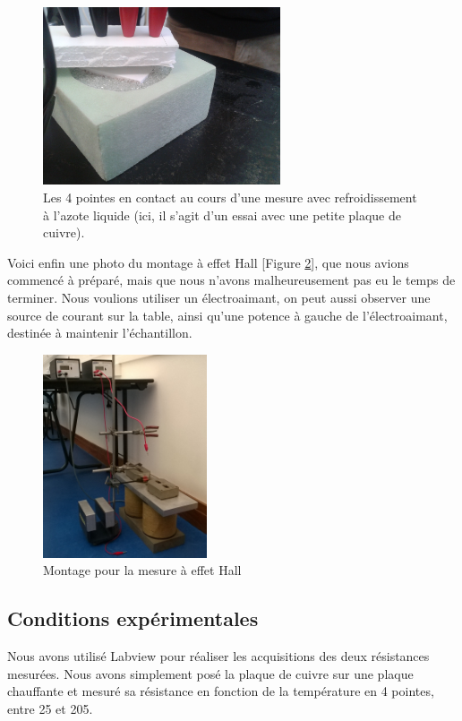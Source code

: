 \begin{figure}
  \begin{center}
		\includegraphics[width=7cm]{./images/photo5.jpg}
		\caption{Les 4 pointes en contact au cours d'une mesure avec refroidissement à l'azote liquide (ici, il s'agit d'un essai avec une petite plaque de cuivre).}
		\label{photo5}
	\end{center}
\end{figure}

Voici enfin une photo du montage à effet Hall [Figure \ref{photo_hall}], que nous avions commencé à préparé, 
mais que nous n'avons malheureusement pas eu le temps de terminer. Nous voulions utiliser un électroaimant, 
on peut aussi observer une source de courant sur la table, ainsi qu'une potence à gauche de l'électroaimant, destinée à maintenir l'échantillon.

\begin{figure}[!t]
  \begin{center}
		\includegraphics[height=6cm]{./images/photo_hall.jpg}
		\caption{Montage pour la mesure à effet Hall}
		\label{photo_hall}
	\end{center}
\end{figure}

\newpage

\subsection{Conditions expérimentales}
Nous avons utilisé Labview pour réaliser les acquisitions des deux résistances mesurées.
Nous avons simplement posé la plaque de cuivre sur une plaque chauffante et mesuré sa résistance en fonction de la température en 4 pointes, entre 25\celsius{} et 205\celsius{}.


